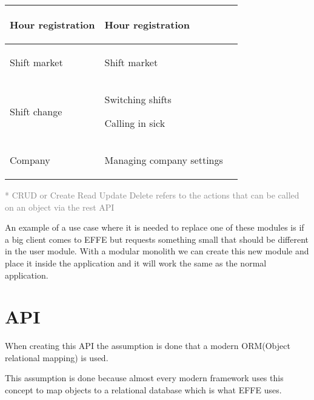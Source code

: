 \begin{tabularx}{\linewidth}{|>{}X|>{}X|>{}X|}
    Hour registration
     &
    \begin{compactitem}
        \item Hour registration
    \end{compactitem}
    \\ \hline

    Shift market
     &
    \begin{compactitem}
        \item Shift market
    \end{compactitem}
    \\ \hline

    Shift change
     &
    \begin{compactitem}
        \item Switching shifts
        \item Calling in sick
    \end{compactitem}
    \\ \hline

    Company
     &
    \begin{compactitem}
        \item Managing company settings
    \end{compactitem}
    \\ \hline
\end{tabularx}

\small{\textcolor{gray}{* CRUD or Create Read Update Delete refers to the actions that can be called on an object via the rest API}}

An example of a use case where it is needed to replace one of these modules is if a big client comes to EFFE but requests something small that should be different in the user module. With a modular monolith we can create this new module and place it inside the application and it will work the same as the normal application.

\section{API}
\label{sec:API}

When creating this API the assumption is done that a modern ORM(Object relational mapping) is used.


This assumption is done because almost every modern framework uses this concept to map objects to a relational database which is what EFFE uses.

